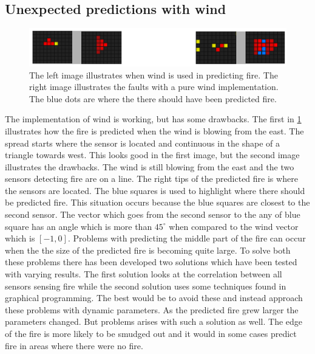 \\\\
\subsection{Unexpected predictions with wind}
\begin{figure}[here]
  \centering
      \includegraphics[width=1.0\textwidth]{solution/graphics/wind-problem.png}
  \caption{The left image illustrates when wind is used in predicting fire. The right image illustrates the faults with a pure wind implementation. The blue dots are where the there should have been predicted fire.}
  \label{fig:wind-problem}
\end{figure}
The implementation of wind is working, but has some drawbacks. The first in \ref{fig:wind-problem} illustrates how the fire is predicted when the wind is blowing from the east. The spread starts where the sensor is located and continuous in the shape of a triangle towards west. This looks good in the first image, but the second image illustrates the drawbacks. The wind is still blowing from the east and the two sensors detecting fire are on a line. The right tips of the predicted fire is where the sensors are located. The blue squares is used to highlight where there should be predicted fire. This situation occurs because the blue squares are closest to the second sensor. The vector which goes from the second sensor to the any of blue square has an angle which is more than $ 45^{\circ} $ when compared to the wind vector which is $ \left[-1,0\right] $. Problems with predicting the middle part of the fire can occur when the the size of the predicted fire is becoming quite large. To solve both these problems there has been developed two solutions which have been tested with varying results. The first solution looks at the correlation between all sensors sensing fire while the second solution uses some techniques found in graphical programming. The best would be to avoid these and instead approach these problems with dynamic parameters. As the predicted fire grew larger the parameters changed. But problems arises with such a solution as well. The edge of the fire is more likely to be smudged out and it would in some cases predict fire in areas where there were no fire.

